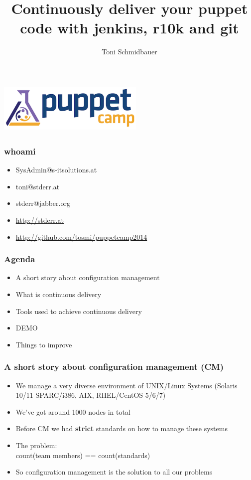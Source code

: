 \documentclass{beamer}
\title{Continuously deliver your puppet code with jenkins, r10k and git\\}
\author{Toni Schmidbauer}
\begin{document}
\begin{frame}
  \center\includegraphics[height=2.5cm,width=7cm]{../pics/puppetcamp_300dpi}
  \titlepage
\end{frame}

\begin{frame}
  \frametitle{whoami}
  \begin{itemize}
  \item SysAdmin@s-itsolutions.at
  \item toni@stderr.at
  \item stderr@jabber.org
  \item \url{http://stderr.at}
  \item \url{http://github.com/tosmi/puppetcamp2014}
  \end{itemize}
\end{frame}
\begin{frame}

  \frametitle{Agenda}

  \begin{itemize}
  \item A short story about configuration management
  \item What is continuous delivery
  \item Tools used to achieve continuous delivery
  \item DEMO
  \item Things to improve
  \end{itemize}

\end{frame}

\begin{frame}
  \frametitle{A short story about configuration management (CM)}

  \begin{itemize}
  \item<1-> We manage a very diverse environment of UNIX/Linux Systems (Solaris 10/11 SPARC/i386, AIX, RHEL/CentOS 5/6/7)
  \item<2-> We've got around 1000 nodes in total
  \item<3-> Before CM we had \textbf{strict} standards on how to manage these systems
  \item<4-> The problem: \\count(team members) == count(standards)
  \item<5-> So configuration management is the solution to all our problems
  \end{itemize}

\end{frame}
\end{document}
